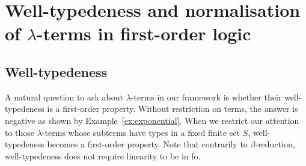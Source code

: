 \section{Well-typedeness and normalisation of $\lambda$-terms in first-order logic}
\label{sec:eval}


\newcommand{\NonLinTerms}[2]{\Lambda_{#1} #2}
 \newcommand{\rlambda}{\ranked{\Lambda}}
 \newcommand{\rlambdalin}{\ranked{\Lambda^{\sf{lin}}}}
 \newcommand{\rlambdathin}{\ranked{\Lambda^{\sf{thin}}}}


\newcommand{\thinterm}[1]{\ranked{\mathsf{Thin}_{#1}}}

\subsection{Well-typedeness}
A natural question to ask about $\lambda$-terms in our framework is whether their well-typedeness is a first-order property. Without restriction on terms, the answer is negative as shown by 
Example~\ref{ex:exponential}.
%
%
%
When we restrict our attention to those $\lambda$-terms whose subterms have types in a fixed finite set $S$, well-typedeness becomes a first-order property. Note that contrarily to $\beta$-reduction, well-typedeness does not require linearity to be in fo.

